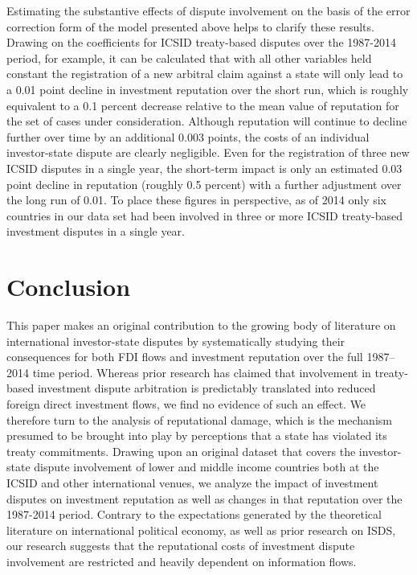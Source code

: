 \documentclass[12pt,onesided]{amsart}
\begin{document}

Estimating the substantive effects of dispute involvement on the basis of the error correction form of the model presented above helps to clarify these results. Drawing on the coefficients for ICSID treaty-based disputes over the 1987-2014 period, for example, it can be calculated that with all other variables held constant the registration of a new arbitral claim against a state will only lead to a 0.01 point decline in investment reputation over the short run, which is roughly equivalent to a 0.1 percent decrease relative to the mean value of reputation for the set of cases under consideration. Although reputation will continue to decline further over time by an additional 0.003 points, the costs of an individual investor-state dispute are clearly negligible. Even for the registration of three new ICSID disputes in a single year, the short-term impact is only an estimated 0.03 point decline in reputation (roughly 0.5 percent) with a further adjustment over the long run of 0.01. To place these figures in perspective, as of 2014 only six countries in our data set had been involved in three or more ICSID treaty-based investment disputes in a single year. 

\section*{Conclusion}

This paper makes an original contribution to the growing body of literature on international investor-state disputes by systematically studying their consequences for both FDI flows and investment reputation over the full 1987--2014 time period. Whereas prior research has claimed that involvement in treaty-based investment dispute arbitration is predictably translated into reduced foreign direct investment flows, we find no evidence of such an effect. We therefore turn to the analysis of reputational damage, which is the mechanism presumed to be brought into play by perceptions that a state has violated its treaty commitments. Drawing upon an original dataset that covers the investor-state dispute involvement of lower and middle income countries both at the ICSID and other international venues, we analyze the impact of investment disputes on investment reputation as well as changes in that reputation over the 1987-2014 period. Contrary to the expectations generated by the theoretical literature on international political economy, as well as prior research on ISDS, our research suggests that the reputational costs of investment dispute involvement are restricted and heavily dependent on information flows. 
\end{document}
